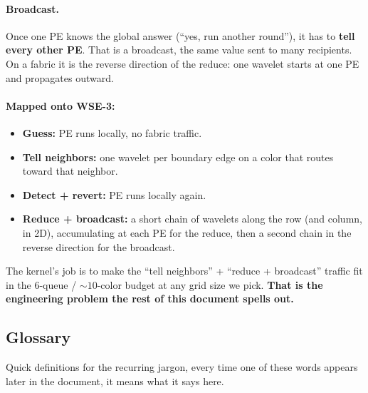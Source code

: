 \documentclass[11pt]{article}
\begin{document}
\paragraph{Broadcast.} Once one PE knows the global answer
(``yes, run another round''), it has to \textbf{tell every other
PE}. That is a broadcast, the same value sent to many
recipients. On a fabric it is the reverse direction of the reduce:
one wavelet starts at one PE and propagates outward.

\paragraph{Mapped onto WSE-3:}
\begin{itemize}[leftmargin=1.3em,itemsep=0.15em]
  \item \textbf{Guess:} PE runs locally, no fabric traffic.
  \item \textbf{Tell neighbors:} one wavelet per boundary edge on
    a color that routes toward that neighbor.
  \item \textbf{Detect + revert:} PE runs locally again.
  \item \textbf{Reduce + broadcast:} a short chain of wavelets
    along the row (and column, in 2D), accumulating at each PE for
    the reduce, then a second chain in the reverse direction for
    the broadcast.
\end{itemize}

The kernel's job is to make the ``tell neighbors'' + ``reduce +
broadcast'' traffic fit in the 6-queue / $\sim\!10$-color budget
at any grid size we pick. \textbf{That is the engineering problem
the rest of this document spells out.}

\subsection{Glossary}

Quick definitions for the recurring jargon, every time one of
these words appears later in the document, it means what it says
here.
\end{document}
